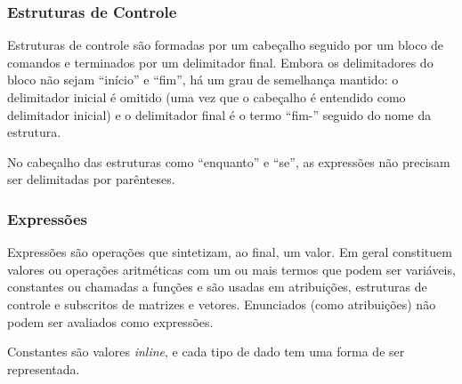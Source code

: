 \documentclass[a4paper,11pt]{report}
\begin{document}
  \subsubsection{Estruturas de Controle}

Estruturas de controle são formadas por um cabeçalho seguido por um bloco de
comandos e terminados por um delimitador final. Embora os delimitadores do bloco
não sejam ``início'' e ``fim'', há um grau de semelhança mantido: o delimitador
inicial é omitido (uma vez que o cabeçalho é entendido como delimitador inicial)
e o delimitador final é o termo ``fim-'' seguido do nome da estrutura.

No cabeçalho das estruturas como ``enquanto'' e ``se'', as expressões não
precisam ser delimitadas por parênteses.

\subsubsection{Expressões}
\label{sec:expr}

Expressões são operações que sintetizam, ao final, um valor. Em geral constituem
valores ou operações aritméticas com um ou mais termos que podem ser variáveis,
constantes ou chamadas a funções e são usadas em atribuições, estruturas de
controle e subscritos de matrizes e vetores. Enunciados (como atribuições) não
podem ser avaliados como expressões.

Constantes são valores \textit{inline}, e cada tipo de dado tem uma forma de
ser representada.
\end{document}
